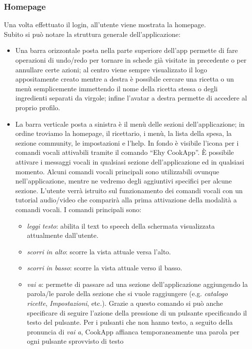 \subsubsection{Homepage}
Una volta effettuato il login, all'utente viene mostrata la homepage.\\
Subito si può notare la struttura generale dell'applicazione:
\begin{itemize}
\item Una barra orizzontale posta nella parte superiore dell'app permette di fare operazioni di undo/redo per tornare in schede già visitate in precedente o per annullare certe azioni; al centro viene sempre visualizzato il logo appositamente creato mentre a destra è possibile cercare una ricetta o un menù semplicemente immettendo il nome della ricetta stessa o degli ingredienti separati da virgole; infine l'avatar a destra permette di accedere al proprio profilo.
\item La barra verticale posta a sinistra è il menù delle sezioni
dell'applicazione; in ordine troviamo la homepage, il ricettario, i
menù, la lista della spesa, la sezione community, le impostazioni e
l'help. In fondo è visibile l'icona per i comandi vocali attivabili
tramite il comando ``Ehy CookApp''.
È possibile attivare i messaggi vocali in qualsiasi sezione
dell'applicazione ed in qualsiasi momento. Alcuni
comandi vocali principali sono utilizzabili ovunque nell'applicazione,
mentre ne vedremo degli aggiuntivi specifici per alcune sezione.
L'utente verrà istruito sul funzionamento dei comandi vocali con un
tutorial audio/video che comparirà alla prima attivazione della modalità
a comandi vocali. I comandi principali sono: 
\begin{itemize} 
	\item \emph{leggi testo}: abilita il text to speech della schermata
visualizzata attualmente dall'utente.
	\item \emph{scorri in alto}: scorre la vista attuale versa l'alto.
	\item \emph{scorri in basso}: scorre la vista attuale verso il
basso.
	\item \emph{vai a}: permette di passare ad una sezione
dell'applicazione aggiungendo la parola/le parole della sezione che si vuole
raggiungere (e.g. \emph{catalogo ricette}, \emph{Impostazioni}, etc.).
Grazie a questo comando si può anche specificare di seguire l'azione
della pressione di un pulsante specificando il testo del pulsante. Per
i pulsanti che non hanno testo, a seguito della pronuncia di \emph{vai
a}, CookApp affianca temporaneamente una parola per ogni pulsante sprovvisto di testo

\end{itemize}
\end{itemize}
